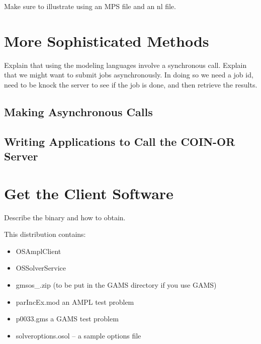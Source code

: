 \documentclass[11pt]{article}
\renewcommand{\{}{{\char"7B}}
\renewcommand{\}}{{\char"7D}}
\renewcommand{\^}{{\char"0D}}
\renewcommand{\'}{{\char"0D}}
\begin{document}
Make sure to illustrate using an MPS file and an nl file. 



\section{More Sophisticated Methods}\label{section:sophisticated}

Explain that using the modeling languages involve a synchronous call. Explain that we might want to submit jobs asynchronously. In doing so we need a job id, need to be knock the server to see if the job is done, and then retrieve the results. 

\subsection{Making Asynchronous Calls}\label{section:async}

\subsection{Writing Applications to Call  the COIN-OR Server}\label{section:applications}


\section{Get the Client Software}\label{section:binary}

Describe the binary and how to obtain.

This distribution contains:

\begin{itemize}

\item OSAmplClient

\item OSSolverService

\item gmsos\_.zip (to be put in the GAMS directory if you use GAMS)

\item parIncEx.mod an AMPL test problem

\item p0033.gms a GAMS  test problem

\item solveroptions.osol -- a sample options file





\end{itemize}
\end{document}

